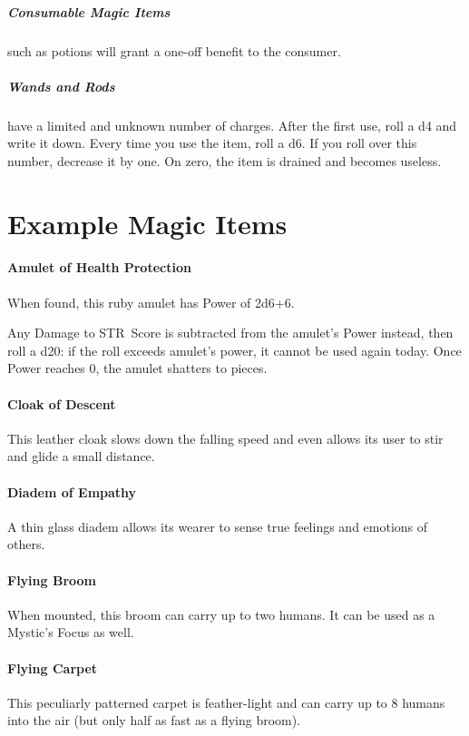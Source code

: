 \documentclass[itdr]{subfiles}
\begin{document}
\vfill

\subparagraph{Consumable Magic Items} such as potions will grant a one-off benefit to the consumer.

\vfill

\subparagraph{Wands and Rods} have a limited and unknown number of charges. After the first use, roll a d4 and write it down. Every time you use the item, roll a d6. If you roll over this number, decrease it by one. On zero, the item is drained and becomes useless.

\vfill
{}
\vfill
\break


\section{Example Magic Items}

\paragraph{Amulet of Health Protection}
When found, this ruby amulet has Power of 2d6+6.

Any Damage to STR~Score is subtracted from the amulet's Power instead, then roll a d20: if the roll exceeds amulet's power, it cannot be used again today. Once Power reaches 0, the amulet shatters to pieces.

\vfill
\paragraph{Cloak of Descent}
This leather cloak slows down the falling speed and even allows its user to stir and glide a small distance.

\vfill
\paragraph{Diadem of Empathy}
A thin glass diadem allows its wearer to sense true feelings and emotions of others.

\vfill
\paragraph{Flying Broom}
When mounted, this broom can carry up to two \mbox{humans}. It can be used as a Mystic's Focus as well.

\vfill
\paragraph{Flying Carpet}
This peculiarly patterned carpet is feather-light and can carry up to 8 humans into the air (but only half as fast as a flying broom).
\end{document}
